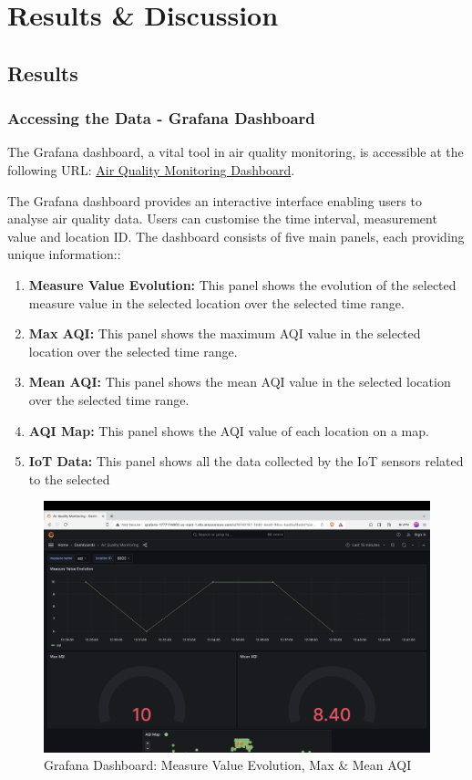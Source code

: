 \documentclass[12pt,oneside]{book} %
\begin{document}
\newpage
\chapter{Results \& Discussion}

\section{Results}
\subsection{Accessing the Data - Grafana Dashboard}

The Grafana dashboard, a vital tool in air quality monitoring, is accessible at
the following URL:
\href{http://grafana-1777174802.us-east-1.elb.amazonaws.com/d/f8742187-f440-4ee8-96cc-bad5af8edef1/air-quality-monitoring}{Air
    Quality Monitoring Dashboard}.

The Grafana dashboard provides an interactive interface enabling users to
analyse air quality data. Users can customise the time interval, measurement
value and location ID. The dashboard consists of five main panels, each
providing unique information::
\begin{enumerate}
    \item \textbf{Measure Value Evolution:} This panel shows the evolution of the selected measure value in the selected location over the selected time range.
    \item \textbf{Max AQI:} This panel shows the maximum AQI value in the selected location over the selected time range.
    \item \textbf{Mean AQI:} This panel shows the mean AQI value in the selected location over the selected time range.
    \item \textbf{AQI Map:} This panel shows the AQI value of each location on a map.
    \item \textbf{IoT Data:} This panel shows all the data collected by the IoT sensors related to the selected
\end{enumerate}

\begin{figure}[H]
    \centering
    \includegraphics[width=1\linewidth]{images/grafana-1.png}
    \caption{Grafana Dashboard: Measure Value Evolution, Max \& Mean AQI}\label{fig:grafana-main-panel-1}
\end{figure}
\end{document}
